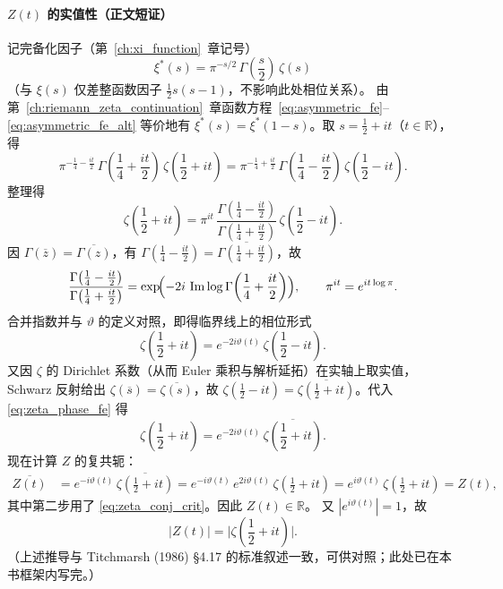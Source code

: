 \paragraph{$Z(t)$ 的实值性（正文短证）}
记完备化因子（第~\ref{ch:xi_function}~章记号）
\[
\xi^*(s)=\pi^{-s/2}\,\Gamma\!\left(\frac{s}{2}\right)\,\zeta(s)
\]
（与 $\xi(s)$ 仅差整函数因子 $\frac12 s(s-1)$，不影响此处相位关系）。
由第~\ref{ch:riemann_zeta_continuation}~章函数方程~\eqref{eq:asymmetric_fe}--\eqref{eq:asymmetric_fe_alt}
等价地有 $\xi^*(s)=\xi^*(1-s)$。取 $s=\frac12+it$（$t\in\mathbb{R}$），得
\begin{equation}
  \pi^{-\frac14-\frac{it}{2}}\,
  \Gamma\!\left(\frac14+\frac{it}{2}\right)\,
  \zeta\!\left(\frac12+it\right)
  =
  \pi^{-\frac14+\frac{it}{2}}\,
  \Gamma\!\left(\frac14-\frac{it}{2}\right)\,
  \zeta\!\left(\frac12-it\right).
  \label{eq:xi_star_crit}
\end{equation}
整理得
\begin{equation}
  \zeta\!\left(\frac12+it\right)
  =
  \pi^{it}\,
  \frac{\Gamma\!\left(\frac14-\frac{it}{2}\right)}{\Gamma\!\left(\frac14+\frac{it}{2}\right)}\,
  \zeta\!\left(\frac12-it\right).
  \label{eq:zeta_crit_fe}
\end{equation}
因 $\Gamma(\overline{z})=\overline{\Gamma(z)}$，有
$\Gamma(\frac14-\frac{it}{2})=\overline{\Gamma(\frac14+\frac{it}{2})}$，故
\[
\frac{\Gamma\!\left(\frac14-\frac{it}{2}\right)}{\Gamma\!\left(\frac14+\frac{it}{2}\right)}
=
\exp\!\Bigl(-2i\,\operatorname{Im}\log\Gamma\!\left(\frac14+\frac{it}{2}\right)\Bigr),
\qquad
\pi^{it}=e^{it\log\pi}.
\]
合并指数并与 $\vartheta$ 的定义对照，即得临界线上的相位形式
\begin{equation}
  \zeta\!\left(\frac12+it\right)
  =
  e^{-2i\vartheta(t)}\,
  \zeta\!\left(\frac12-it\right).
  \label{eq:zeta_phase_fe}
\end{equation}
又因 $\zeta$ 的 Dirichlet 系数（从而 Euler 乘积与解析延拓）在实轴上取实值，
Schwarz 反射给出 $\zeta(\overline{s})=\overline{\zeta(s)}$，故
$\zeta(\frac12-it)=\overline{\zeta(\frac12+it)}$。代入 \eqref{eq:zeta_phase_fe} 得
\begin{equation}
  \zeta\!\left(\frac12+it\right)
  =
  e^{-2i\vartheta(t)}\,
  \overline{\zeta\!\left(\frac12+it\right)}.
  \label{eq:zeta_conj_crit}
\end{equation}
现在计算 $Z$ 的复共轭：
\begin{align*}
  \overline{Z(t)}
  &=
  e^{-i\vartheta(t)}\,
  \overline{\zeta\!\left(\frac12+it\right)}
  =
  e^{-i\vartheta(t)}\,
  e^{2i\vartheta(t)}\,
  \zeta\!\left(\frac12+it\right)
  =
  e^{i\vartheta(t)}\,
  \zeta\!\left(\frac12+it\right)
  =
  Z(t),
\end{align*}
其中第二步用了 \eqref{eq:zeta_conj_crit}。因此 $Z(t)\in\mathbb{R}$。
又 $|e^{i\vartheta(t)}|=1$，故
\[
  |Z(t)|=\bigl|\zeta\!\left(\frac12+it\right)\bigr|.
\]
（上述推导与 Titchmarsh (1986) §4.17 的标准叙述一致，可供对照；此处已在本书框架内写完。）

